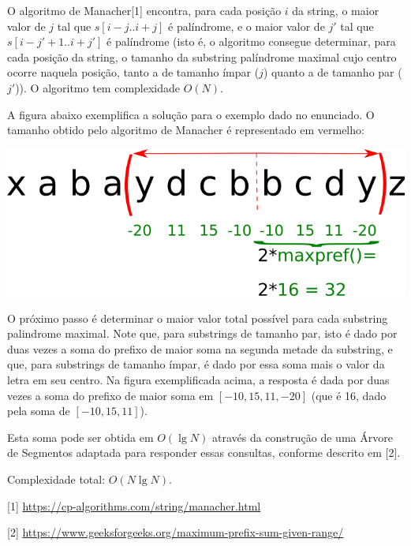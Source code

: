 O algoritmo de Manacher[1] encontra, para cada posição $i$ da string, o maior
valor de $j$ tal que $s[i-j..i+j]$ é palíndrome, e o maior valor de $j'$ tal que
$s[i-j'+1..i+j']$ é palíndrome (isto é, o algoritmo consegue determinar, para cada
posição da string, o tamanho da substring palíndrome maximal cujo centro ocorre
naquela posição, tanto a de tamanho ímpar ($j$) quanto a de tamanho par ($j'$)). O algoritmo tem complexidade $O(N)$.

A figura abaixo exemplifica a solução para o exemplo dado no enunciado. O
tamanho obtido pelo algoritmo de Manacher é representado em vermelho:

\begin{center}
    \includegraphics[scale=0.65]{drawkcab/editorial.png}
\end{center}

O próximo passo é determinar o maior valor total possível para cada substring
palindrome maximal. Note que, para substrings de tamanho par, isto é dado por
duas vezes a soma do prefixo de maior soma na segunda metade da substring, e
que, para substrings de tamanho ímpar, é dado por essa soma mais o valor da
letra em seu centro. Na figura exemplificada acima, a resposta é dada por duas vezes a soma do prefixo de maior
soma em $[-10,15,11,-20]$ (que é 16, dado pela soma de $[-10,15,11]$).

Esta soma
pode ser obtida em $O(\lg N)$ através da construção de uma Árvore de
Segmentos adaptada para responder essas consultas, conforme descrito em [2].

Complexidade total: $O(N\lg N)$.

[1] \url{https://cp-algorithms.com/string/manacher.html}

[2] \url{https://www.geeksforgeeks.org/maximum-prefix-sum-given-range/}
